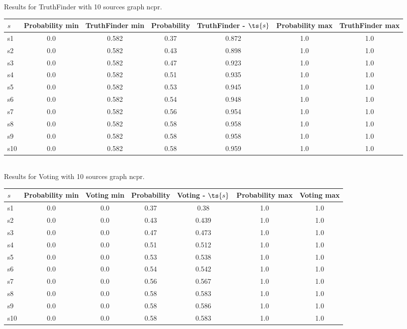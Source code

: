\documentclass{article}
\begin{document}
\noindent Results for TruthFinder with 10 sources graph ncpr.

\noindent\begin{tabular}{|l|c|c|c|c|c|c|}
\hline
$s$& Probability min & TruthFinder min & Probability & TruthFinder - $\ts{s}$ & Probability max & TruthFinder max\\
\hline
s1 &0.0 & 0.582 & 0.37 & 0.872 & 1.0 & 1.0\\
\hline
s2 &0.0 & 0.582 & 0.43 & 0.898 & 1.0 & 1.0\\
\hline
s3 &0.0 & 0.582 & 0.47 & 0.923 & 1.0 & 1.0\\
\hline
s4 &0.0 & 0.582 & 0.51 & 0.935 & 1.0 & 1.0\\
\hline
s5 &0.0 & 0.582 & 0.53 & 0.945 & 1.0 & 1.0\\
\hline
s6 &0.0 & 0.582 & 0.54 & 0.948 & 1.0 & 1.0\\
\hline
s7 &0.0 & 0.582 & 0.56 & 0.954 & 1.0 & 1.0\\
\hline
s8 &0.0 & 0.582 & 0.58 & 0.958 & 1.0 & 1.0\\
\hline
s9 &0.0 & 0.582 & 0.58 & 0.958 & 1.0 & 1.0\\
\hline
s10 &0.0 & 0.582 & 0.58 & 0.959 & 1.0 & 1.0\\
\hline
\end{tabular}\\

\noindent Results for Voting with 10 sources graph ncpr.

\noindent\begin{tabular}{|l|c|c|c|c|c|c|}
\hline
$s$& Probability min & Voting min & Probability & Voting - $\ts{s}$ & Probability max & Voting max\\
\hline
s1 &0.0 & 0.0 & 0.37 & 0.38 & 1.0 & 1.0\\
\hline
s2 &0.0 & 0.0 & 0.43 & 0.439 & 1.0 & 1.0\\
\hline
s3 &0.0 & 0.0 & 0.47 & 0.473 & 1.0 & 1.0\\
\hline
s4 &0.0 & 0.0 & 0.51 & 0.512 & 1.0 & 1.0\\
\hline
s5 &0.0 & 0.0 & 0.53 & 0.538 & 1.0 & 1.0\\
\hline
s6 &0.0 & 0.0 & 0.54 & 0.542 & 1.0 & 1.0\\
\hline
s7 &0.0 & 0.0 & 0.56 & 0.567 & 1.0 & 1.0\\
\hline
s8 &0.0 & 0.0 & 0.58 & 0.583 & 1.0 & 1.0\\
\hline
s9 &0.0 & 0.0 & 0.58 & 0.586 & 1.0 & 1.0\\
\hline
s10 &0.0 & 0.0 & 0.58 & 0.583 & 1.0 & 1.0\\
\hline
\end{tabular}\\
\end{document}
